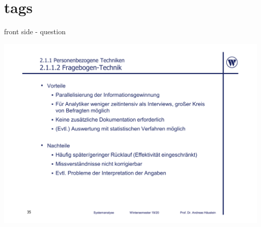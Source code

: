 \documentclass{article}
\begin{document}
\section{tags}

\begin{tcolorbox}[colback=white!10!white,colframe=lightgray!75!black,
  savelowerto=\jobname_ex.tex]
	
	\begin{center}
  	front side - question
	\end{center}

  \tcblower


	\begin{center}
		\includegraphics[width=\linewidth]{test}
	\end{center}

\end{tcolorbox}
\end{document}
